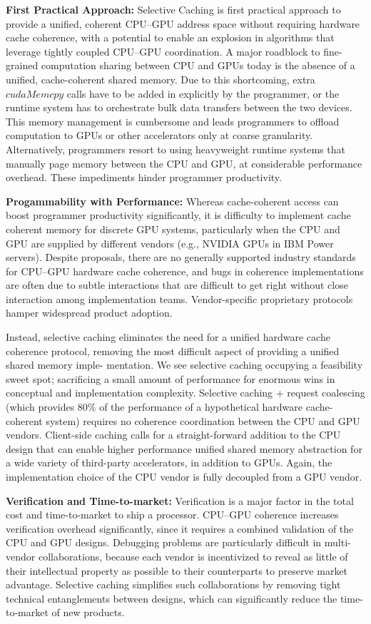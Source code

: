 \textbf{First Practical Approach:} Selective Caching is first practical approach
to provide a unified, coherent CPU--GPU address space without requiring hardware
cache coherence, with a potential to enable an explosion in algorithms that leverage tightly
coupled CPU--GPU coordination.  A major roadblock to fine-grained computation
sharing between CPU and GPUs today is the absence of a unified, cache-coherent
shared memory. Due to this shortcoming, extra $cudaMemcpy$ calls have to be added
in explicitly by the programmer, or the runtime system has to orchestrate bulk
data transfers between the two devices. This memory management is cumbersome
and leads programmers to offload computation to GPUs or other accelerators only
at coarse granularity.  Alternatively, programmers resort to using heavyweight
runtime systems that manually page memory between the CPU and GPU, at
considerable performance overhead. These impediments hinder programmer
productivity.

\textbf{Progammability with Performance:} Whereas cache-coherent access
can boost programmer productivity significantly, it is difficulty to implement
cache coherent memory for discrete GPU systems, particularly when the CPU and
GPU are supplied by different vendors (e.g., NVIDIA GPUs in IBM Power servers).
Despite proposals, there are no generally supported industry standards for
CPU--GPU hardware cache coherence, and bugs in coherence implementations are
often due to subtle interactions that are difficult to get right without close
interaction among implementation teams. Vendor-specific proprietary protocols
hamper widespread product adoption.

Instead, selective caching eliminates the need for a unified hardware cache
coherence protocol, removing the most difficult aspect of providing a unified
shared memory imple- mentation. We see selective caching occupying a feasibility
sweet spot; sacrificing a small amount of performance for enormous wins in
conceptual and implementation complexity. Selective caching + request
coalescing (which provides 80\% of the performance of a hypothetical hardware
cache-coherent system) requires no coherence coordination between the CPU and
GPU vendors. Client-side caching calls for a straight-forward addition to the
CPU design that can enable higher performance unified shared memory abstraction
for a wide variety of third-party accelerators, in addition to GPUs. Again, the
implementation choice of the CPU vendor is fully decoupled from a GPU vendor.

\textbf{Verification and Time-to-market:} Verification is a major factor in the total
cost and time-to-market to ship a processor. CPU--GPU coherence increases
verification overhead significantly, since it requires a combined validation of
the CPU and GPU designs. Debugging problems are particularly difficult in
multi-vendor collaborations, because each vendor is incentivized to reveal as
little of their intellectual property as possible to their counterparts to
preserve market advantage. Selective caching simplifies such collaborations by
removing tight technical entanglements between designs, which can significantly
reduce the time-to-market of new products.

